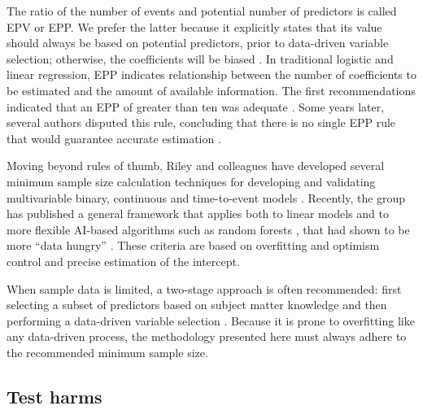 The ratio of the number of events and potential number of predictors is called \gls{EPV} or \gls{EPP}. We prefer the latter because it explicitly states that its value should always be based on potential predictors, prior to data-driven variable selection; otherwise, the coefficients will be biased  \cite{steyerbergLogisticRegressionModeling2011}. In traditional logistic and linear regression, \gls{EPP} indicates relationship between the number of coefficients to be estimated and the amount of available information. The first recommendations indicated that an \gls{EPP} of greater than ten was adequate \cite{concatoImportanceEventsIndependent1995,peduzziSimulationStudyNumber1996}. Some years later, several authors disputed this rule, concluding that there is no single \gls{EPP} rule that would guarantee accurate estimation \cite{vittinghoffRelaxingRuleTen2007,courvoisierPerformanceLogisticRegression2011,vansmedenNoRationale12016}.

Moving beyond rules of thumb, Riley and colleagues have developed several minimum sample size calculation techniques for developing and validating multivariable binary, continuous and time-to-event models \cite{archerMinimumSampleSize2021,pateMinimumSampleSize2023,rileyMinimumSampleSize2022,rileyEvaluationClinicalPrediction2024a,rileyMinimumSampleSize2019,rileyMinimumSampleSize2019a}. Recently, the group has published a general framework that applies both to linear models and to more flexible AI-based algorithms such as random forests \cite{rileyGeneralSampleSize2026}, that had shown to be more ``data hungry'' \cite{austinRelativeDataHungriness2024,vanderploegModernModellingTechniques2014}. These criteria are based on overfitting and optimism control and precise estimation of the intercept.

When sample data is limited, a two-stage approach is often recommended: first selecting a subset of predictors based on subject matter knowledge and then performing a data-driven variable selection \cite{harrellRegressionModelingStrategies2015,steyerberg2019clinical}. Because it is prone to overfitting like any data-driven process, the methodology presented here must always adhere to the recommended minimum sample size.

\subsection{Test harms}

